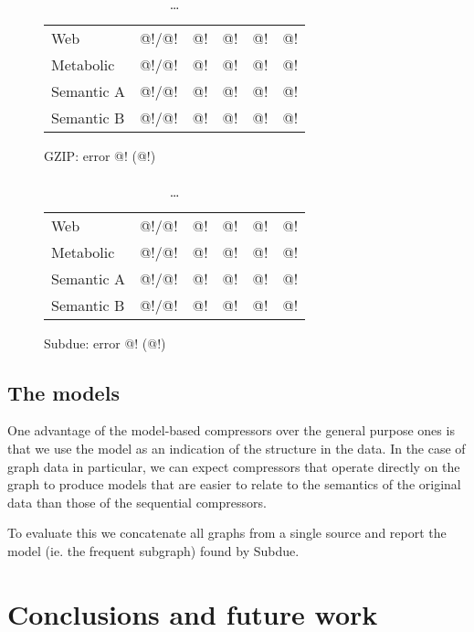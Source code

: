 \documentclass[10pt,a4paper,oneside]{article}
\begin{document}
\begin{table}[h]
\label{table:real-life}
\begin{subfigure}[b]{1\columnwidth}
\centering
\begin{tabular}{l | r | r r r r}
\hline
  Web      & @!/@!  & @! & @! & @! & @! \\
  Metabolic     & @!/@!  & @! & @! & @! & @!\\
  Semantic A & @!/@!  & @! & @! & @! & @!\\
  Semantic B & @!/@!  & @! & @! & @! & @!\\
\hline
\end{tabular}
\caption{GZIP: error @! (@!)}
\end{subfigure}
\vspace{3mm}

\begin{subfigure}[b]{1\columnwidth}
\centering
\begin{tabular}{l | r | r r r r}
\hline
  Web      & @!/@!  & @! & @! & @! & @! \\
  Metabolic     & @!/@!  & @! & @! & @! & @!\\
  Semantic A & @!/@!  & @! & @! & @! & @!\\
  Semantic B & @!/@! & @! & @! & @! & @!\\
\hline
\end{tabular}
\caption{Subdue: error @! (@!)}
\end{subfigure}
\caption{\ldots}
\end{table}

\subsection*{The models}

One advantage of the model-based compressors over the general purpose ones is that we use the model as an indication of the structure in the data. In the case of graph data in particular, we can expect compressors that operate directly on the graph to produce models that are easier to relate to the semantics of the original data than those of the sequential compressors. 

To evaluate this we concatenate all graphs from a single source and report the model (ie. the frequent subgraph) found by Subdue.

\section*{Conclusions and future work}
\end{document}
